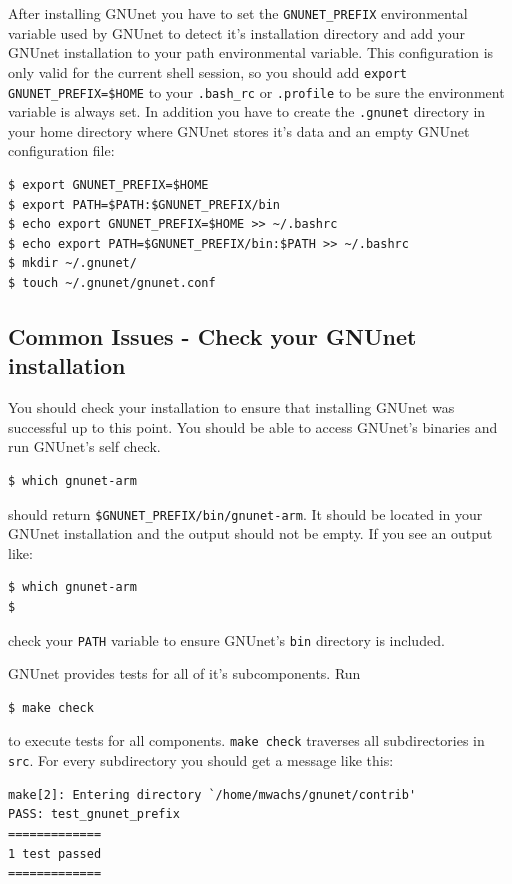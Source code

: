 \documentclass[10pt]{article}
\begin{document}
After installing GNUnet you have to set the \lstinline|GNUNET_PREFIX| environmental variable used by GNUnet to detect it's installation directory and add your GNUnet installation to your path environmental variable.
This configuration is only valid for the current shell session, so you should add \lstinline|export GNUNET_PREFIX=$HOME| to your \lstinline|.bash_rc| or \lstinline|.profile| to be sure the environment variable is always set. In addition you have to create the \lstinline|.gnunet| directory in your home directory where GNUnet stores it's data and an empty GNUnet configuration file:

\lstset{language=bash}
\begin{lstlisting}
$ export GNUNET_PREFIX=$HOME 
$ export PATH=$PATH:$GNUNET_PREFIX/bin
$ echo export GNUNET_PREFIX=$HOME >> ~/.bashrc
$ echo export PATH=$GNUNET_PREFIX/bin:$PATH >> ~/.bashrc
$ mkdir ~/.gnunet/
$ touch ~/.gnunet/gnunet.conf
\end{lstlisting}

\subsection{Common Issues - Check your GNUnet installation}
You should check your installation to ensure that installing GNUnet was successful up to this point. You should be able to access GNUnet's binaries and run GNUnet's self check.
\begin{lstlisting}
$ which gnunet-arm 
\end{lstlisting}
should return \lstinline|$GNUNET_PREFIX/bin/gnunet-arm|. It should be located in your GNUnet installation and the output should not be empty. If you see an output like:
\begin{lstlisting}
$ which gnunet-arm
$ 
\end{lstlisting}
check your {\tt PATH} variable to ensure GNUnet's {\tt bin} directory is included.

GNUnet provides tests for all of it's subcomponents. Run
\begin{lstlisting}
$ make check
\end{lstlisting}
to execute tests for all components. {\tt make check} traverses all subdirectories in {\tt src}. 
For every subdirectory you should get a message like this:

\begin{lstlisting}
make[2]: Entering directory `/home/mwachs/gnunet/contrib'
PASS: test_gnunet_prefix
=============
1 test passed
=============
\end{lstlisting}
\end{document}
